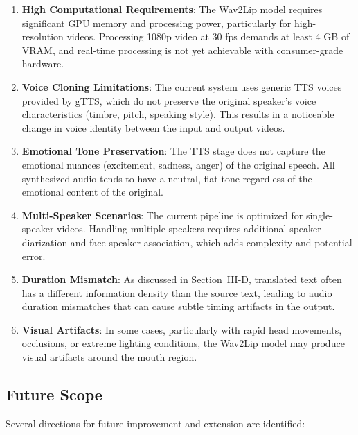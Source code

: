 \documentclass[conference]{IEEEtran}
\begin{document}
\begin{enumerate}
    \item \textbf{High Computational Requirements}: The Wav2Lip model requires significant GPU memory and processing power, particularly for high-resolution videos. Processing 1080p video at 30 fps demands at least 4 GB of VRAM, and real-time processing is not yet achievable with consumer-grade hardware.
    
    \item \textbf{Voice Cloning Limitations}: The current system uses generic TTS voices provided by gTTS, which do not preserve the original speaker's voice characteristics (timbre, pitch, speaking style). This results in a noticeable change in voice identity between the input and output videos.
    
    \item \textbf{Emotional Tone Preservation}: The TTS stage does not capture the emotional nuances (excitement, sadness, anger) of the original speech. All synthesized audio tends to have a neutral, flat tone regardless of the emotional content of the original.
    
    \item \textbf{Multi-Speaker Scenarios}: The current pipeline is optimized for single-speaker videos. Handling multiple speakers requires additional speaker diarization and face-speaker association, which adds complexity and potential error.
    
    \item \textbf{Duration Mismatch}: As discussed in Section~III-D, translated text often has a different information density than the source text, leading to audio duration mismatches that can cause subtle timing artifacts in the output.
    
    \item \textbf{Visual Artifacts}: In some cases, particularly with rapid head movements, occlusions, or extreme lighting conditions, the Wav2Lip model may produce visual artifacts around the mouth region.
\end{enumerate}

\subsection{Future Scope}

Several directions for future improvement and extension are identified:
\end{document}
